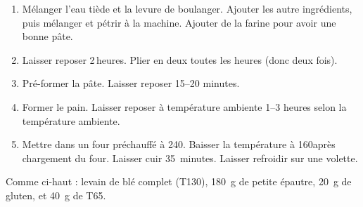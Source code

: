 
\begin{ingredients}
\end{ingredients}


\begin{recipe}
  \begin{enumerate}

  \item Mélanger l'eau tiède et la levure de boulanger.  Ajouter les
    autre ingrédients, puis mélanger et pétrir à la machine.  Ajouter
    de la farine pour avoir une bonne pâte.
    
  \item Laisser reposer 2$\,$\fracH heures.  Plier en deux toutes les
    heures (donc deux fois).
    
  \item Pré-former la pâte.  Laisser reposer 15--20 minutes.
    
  \item Former le pain.  Laisser reposer à température ambiente 1--3
    heures selon la température ambiente.
    
  \item Mettre dans un four préchauffé à 240\degreeC.  Baisser la
    température à 160\degreeC après chargement du four.  Laisser cuir
    35~minutes.  Laisser refroidir sur une volette.

  \end{enumerate}
\end{recipe}


Comme ci-haut : levain de blé complet (T130), 180~g de petite épautre,
20~g de gluten, et 40~g de T65.

